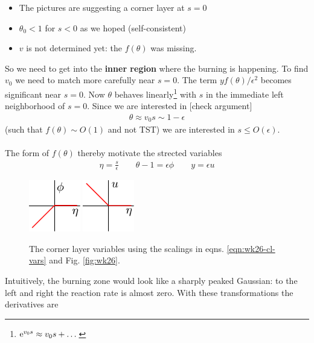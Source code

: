 \begin{itemize}
	\item The pictures are suggesting a corner layer at $s=0$
	\item $\theta_0 < 1$ for $s<0$ as we hoped (self-consistent) 
	\item $v$ is not determined yet:  the $f(\theta)$ was missing.
\end{itemize}
So we need to get into the {\bf inner region} where the burning is happening. To find $v_0$ we need to match more carefully near $s=0$. The term $y f(\theta)/\epsilon^2$ becomes significant near $s=0$. Now $\theta$ behaves linearly\footnote{$\mathrm{e}^{v_0s} \approx v_0s + \dots $} with $s$ in the immediate left neighborhood of $s=0$. Since we are interested in {\color{red} [check argument]}
\begin{align*}
	\theta \approx v_0s \sim 1 - \epsilon 
\end{align*}
(such that $f(\theta)\sim O(1)$ and not TST) we are interested in $s \leq O(\epsilon)$. \\\\
The form of $f(\theta)$ thereby motivate the strected variables
\begin{gather}\label{eqn:wk26-cl-vars}
	\eta = \frac{s}{\epsilon} \qquad \theta - 1 = \epsilon \phi \qquad y = \epsilon u
\end{gather}
\begin{figure}[!h]
	\centering
	\includegraphics[width=0.2\textwidth]{./plots/pdf/burning-front-phi.pdf} \qquad 
	\includegraphics[width=0.2\textwidth]{./plots/pdf/burning-front-u.pdf}
	\caption{The corner layer variables using the scalings in eqns. \ref{eqn:wk26-cl-vars} and Fig. \ref{fig:wk26}.}
	\label{fig:wk26-phi-u}
\end{figure}
Intuitively, the burning zone would look like a sharply peaked Gaussian: to the left and right the reaction rate is almost zero. With these transformations the derivatives are
